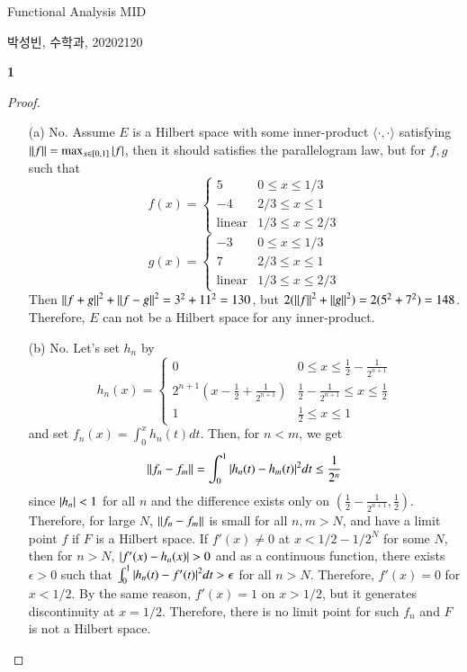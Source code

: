 \documentclass[a4paper, 12pt]{article}
\theoremstyle{Mydefinition}
\theoremstyle{Mytheorem}
\begin{document}
\thispagestyle{myfirstpage}
\begin{center}
    \Large{Functional Analysis MID}
\end{center}
박성빈, 수학과, 20202120

\noindent \textbf{1}
\begin{proof}
\begin{enumerate}
    \item[(a)] No. Assume $E$ is a Hilbert space with some inner-product $\langle \cdot, \cdot \rangle$ satisfying $\norm{f} =\max_{x\in[0,1]}\abs{f}$, then it should satisfies the parallelogram law, but for $f,g$ such that
    \begin{equation}
        f(x) = \begin{cases}
        5 & 0\leq x\leq 1/3\\
        -4 & 2/3\leq x\leq 1\\
        \textrm{linear} & 1/3\leq x\leq 2/3
        \end{cases}
    \end{equation}
    \begin{equation}
        g(x) =
        \begin{cases}
        -3 & 0\leq x\leq 1/3 \\
        7 & 2/3\leq x\leq 1\\
        \textrm{linear} & 1/3\leq x\leq 2/3
        \end{cases}
    \end{equation}
    Then $\norm{f+g}^2+\norm{f-g}^2 = 3^2 + 11^2 = 130$, but $2(\norm{f}^2+\norm{g}^2) = 2(5^2+7^2) = 148$. Therefore, $E$ can not be a Hilbert space for any inner-product.
    \item[(b)] No. Let's set $h_n$ by
    \begin{equation}
        h_n(x) = \begin{cases}
        0 & 0\leq x\leq \frac{1}{2}-\frac{1}{2^{n+1}}\\
        2^{n+1}\left(x-\frac{1}{2}+\frac{1}{2^{n+1}}\right) & \frac{1}{2}-\frac{1}{2^{n+1}}\leq x\leq \frac{1}{2}\\
        1 & \frac{1}{2}\leq x\leq 1
        \end{cases}
    \end{equation}
    and set $f_n(x) = \int_0^x h_n(t) dt$. Then, for $n<m$, we get
    \begin{equation}
        \norm{f_n-f_m} = \int_0^1 \abs{h_n(t)-h_m(t)}^2 dt \leq \frac{1}{2^n}
    \end{equation}
    since $\abs{h_n}<1$ for all $n$ and the difference exists only on $\left( \frac{1}{2}-\frac{1}{2^{n+1}}, \frac{1}{2}\right)$. Therefore, for large $N$, $\norm{f_n-f_m}$ is small for all $n,m>N$, and have a limit point $f$ if $F$ is a Hilbert space. If $f'(x)\neq 0$ at $x<1/2 - 1/2^N$ for some $N$, then for $n>N$, $\abs{f'(x) - h_n(x)}>0$ and as a continuous function, there exists $\epsilon>0$ such that $\int_0^1 \abs{h_n(t)-f'(t)}^2 dt>\epsilon$ for all $n>N$. Therefore, $f'(x) = 0$ for $x<1/2$. By the same reason, $f'(x) = 1$ on $x>1/2$, but it generates discontinuity at $x=1/2$. Therefore, there is no limit point for such $f_n$ and $F$ is not a Hilbert space.
\end{enumerate}
\end{proof}
\end{document}
